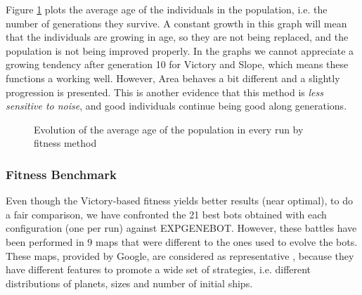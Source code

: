 \documentclass[preprint]{elsarticle}
\begin{document}
Figure \ref{figura:evolutionAGE} plots the average age of the individuals in the population, i.e. the number of generations they survive. A constant growth in this graph will mean that the individuals are growing in age, so they are not being replaced, and the population is not being improved properly.
In the graphs we cannot appreciate a growing tendency after generation 10 for Victory and Slope, which means these functions a working well. However, Area behaves a bit different and a slightly progression is presented. This is another evidence that this method is \textit{less sensitive to noise}, and good individuals continue being good along generations. 


 \begin{figure}[ht]
 \begin{center}
 \end{center}
 \caption{Evolution of the average age of the population in every run by fitness
   method} 
 \label{figura:evolutionAGE}
 \end{figure}



\subsubsection{Fitness Benchmark}
\label{subsubsec:fitness_benchmark}

Even though the Victory-based fitness yields better results
(near optimal), to do a fair comparison, we have confronted the 21
best bots obtained with each configuration (one per run) against
EXPGENEBOT. However, these battles have been performed in 9 maps that were
different to the ones used to evolve the bots. These maps, provided by Google, are considered as representative \cite{ExpGenebot_CIG2012}, because they have different features to promote a wide set of strategies, i.e. different distributions of planets, sizes and number of initial ships. 
\end{document}
